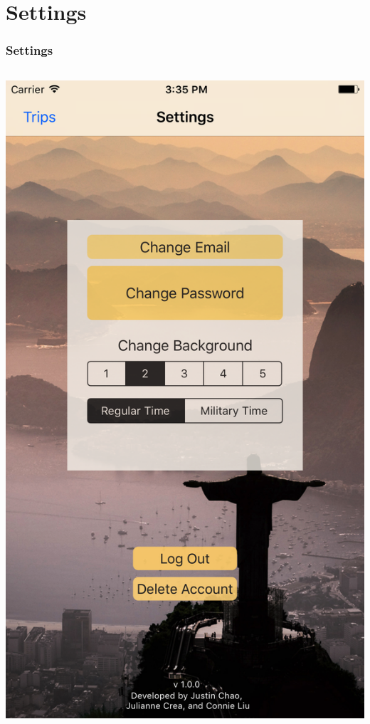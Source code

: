 \documentclass{beamer}
\begin{document}
\section{Settings}
\begin{frame}
\frametitle{Settings}
\begin{columns}
    \begin{column}{0.3\textwidth}
        \begin{center}
            \includegraphics[scale=0.08]{settings1}
        \end{center}

\end{column}
\end{columns}
\end{frame}
\end{document}
